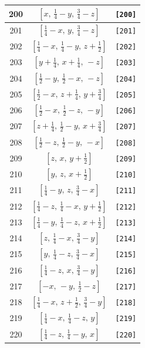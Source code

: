 \documentclass[fleqn,8pt]{jsarticle}
\begin{document}
\begin{longtable}{ccc}
200 & $\left[ x,\, \frac{1}{4} - y,\, \frac{3}{4} - z \right]$ & {\tt [200]} \\ \hline
201 & $\left[ \frac{1}{4} - x,\, y,\, \frac{3}{4} - z \right]$ & {\tt [201]} \\ \hline
202 & $\left[ \frac{1}{4} - x,\, \frac{1}{4} - y,\, z + \frac{1}{2} \right]$ & {\tt [202]} \\ \hline
203 & $\left[ y + \frac{1}{4},\, x + \frac{1}{4},\, - z \right]$ & {\tt [203]} \\ \hline
204 & $\left[ \frac{1}{2} - y,\, \frac{1}{2} - x,\, - z \right]$ & {\tt [204]} \\ \hline
205 & $\left[ \frac{1}{2} - x,\, z + \frac{1}{4},\, y + \frac{3}{4} \right]$ & {\tt [205]} \\ \hline
206 & $\left[ \frac{1}{2} - x,\, \frac{1}{2} - z,\, - y \right]$ & {\tt [206]} \\ \hline
207 & $\left[ z + \frac{1}{4},\, \frac{1}{2} - y,\, x + \frac{3}{4} \right]$ & {\tt [207]} \\ \hline
208 & $\left[ \frac{1}{2} - z,\, \frac{1}{2} - y,\, - x \right]$ & {\tt [208]} \\ \hline
209 & $\left[ z,\, x,\, y + \frac{1}{2} \right]$ & {\tt [209]} \\ \hline
210 & $\left[ y,\, z,\, x + \frac{1}{2} \right]$ & {\tt [210]} \\ \hline
211 & $\left[ \frac{1}{4} - y,\, z,\, \frac{3}{4} - x \right]$ & {\tt [211]} \\ \hline
212 & $\left[ \frac{1}{4} - z,\, \frac{1}{4} - x,\, y + \frac{1}{2} \right]$ & {\tt [212]} \\ \hline
213 & $\left[ \frac{1}{4} - y,\, \frac{1}{4} - z,\, x + \frac{1}{2} \right]$ & {\tt [213]} \\ \hline
214 & $\left[ z,\, \frac{1}{4} - x,\, \frac{3}{4} - y \right]$ & {\tt [214]} \\ \hline
215 & $\left[ y,\, \frac{1}{4} - z,\, \frac{3}{4} - x \right]$ & {\tt [215]} \\ \hline
216 & $\left[ \frac{1}{4} - z,\, x,\, \frac{3}{4} - y \right]$ & {\tt [216]} \\ \hline
217 & $\left[ - x,\, - y,\, \frac{1}{2} - z \right]$ & {\tt [217]} \\ \hline
218 & $\left[ \frac{1}{4} - x,\, z + \frac{1}{2},\, \frac{3}{4} - y \right]$ & {\tt [218]} \\ \hline
219 & $\left[ \frac{1}{4} - x,\, \frac{1}{4} - z,\, y \right]$ & {\tt [219]} \\ \hline
220 & $\left[ \frac{1}{4} - z,\, \frac{1}{4} - y,\, x \right]$ & {\tt [220]} \\ \hline

\end{longtable}
\end{document}
